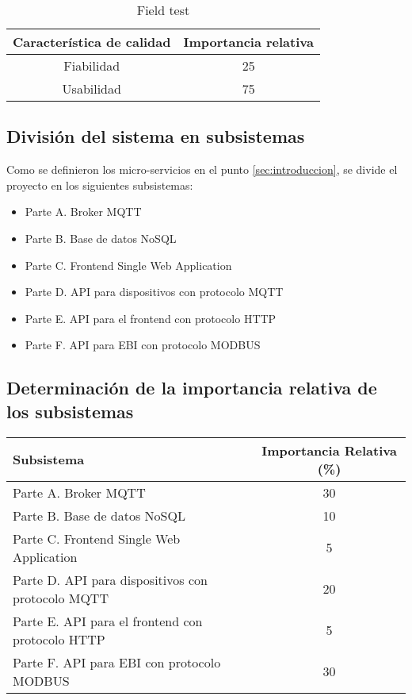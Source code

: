 \documentclass[
11pt,
spanish,
singlespacing,
parskip, 
headsepline,
a4paper
]{article}
\begin{document}
\begin{table}[H]
\centering
\caption{Field test}
\begin{tabular}{c|c}
Característica de calidad & Importancia relativa \\ \hline
Fiabilidad & 25 \\
Usabilidad & 75 \\
\end{tabular}
\end{table}

\subsection{División del sistema en subsistemas}
Como se definieron los micro-servicios en el punto \ref{sec:introduccion}, se divide el proyecto en los siguientes subsistemas:

\begin{itemize}
\item Parte A. Broker MQTT
\item Parte B. Base de datos NoSQL
\item Parte C. Frontend Single Web Application
\item Parte D. API para dispositivos con protocolo MQTT
\item Parte E. API para el frontend con protocolo HTTP
\item Parte F. API para EBI con protocolo MODBUS
\end{itemize}

\subsection{Determinación de la importancia relativa de los subsistemas}

\begin{table}[H]
\centering
\begin{tabular}{l|c}
Subsistema                                         & Importancia Relativa (\%) \\ \hline
Parte A. Broker MQTT                               & 30 \\
Parte B. Base de datos NoSQL                       & 10 \\
Parte C. Frontend Single Web Application           & 5 \\
Parte D. API para dispositivos con protocolo MQTT  & 20 \\
Parte E. API para el frontend con protocolo HTTP   & 5 \\
Parte F. API para EBI con protocolo MODBUS         & 30 \\
\end{tabular}
\end{table}
\end{document}
